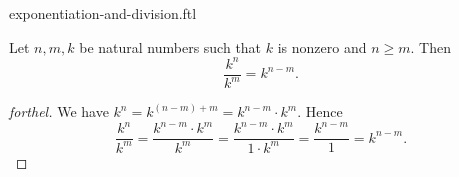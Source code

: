 \documentclass{naproche-library}
\begin{document}
\begin{smodule}[title=Exponentiation and Division]{exponentiation-and-division.ftl}

\begin{proposition}[forthel,id=ARITHMETIC_14_2345102698451257]
  Let $n, m, k$ be natural numbers such that $k$ is nonzero and $n \geq m$.
  Then \[\frac{k^{n}}{k^{m}} = k^{n - m}.\]
\end{proposition}
\begin{proof}[forthel]
  We have $k^{n} = k^{(n - m) + m} = k^{n - m} \cdot k^{m}$.
  Hence
  \[  \frac{k^{n}}{k^{m}}
      = \frac{k^{n - m} \cdot k^{m}}{k^{m}}
      = \frac{k^{n - m} \cdot k^{m}}{1 \cdot k^{m}}
      = \frac{k^{n - m}}{1}
      = k^{n - m}. \]
\end{proof}
\end{smodule}
\end{document}
